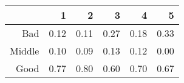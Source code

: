 \begin{table}[ht]
\centering
\begin{tabular}{rrrrrr}
  \hline
 & 1 & 2 & 3 & 4 & 5 \\ 
  \hline
Bad & 0.12 & 0.11 & 0.27 & 0.18 & 0.33 \\ 
  Middle & 0.10 & 0.09 & 0.13 & 0.12 & 0.00 \\ 
  Good & 0.77 & 0.80 & 0.60 & 0.70 & 0.67 \\ 
   \hline
\end{tabular}
\end{table}
